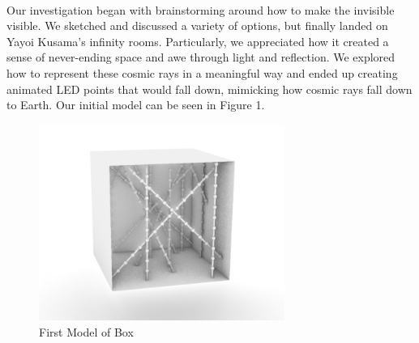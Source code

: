 \documentclass{article}
\begin{document}
\paragraph{}Our investigation began with brainstorming around how to make the invisible visible. We sketched and discussed a variety of options, but finally landed on Yayoi Kusama’s infinity rooms. Particularly, we appreciated how it created a sense of never-ending space and awe through light and reflection. We explored how to represent these cosmic rays in a meaningful way and ended up creating animated LED points that would fall down, mimicking how cosmic rays fall down to Earth. Our initial model can be seen in Figure 1.
\begin{figure}
    \centering
    \includegraphics[width=0.7143\textwidth]{model.jpg}
    \caption{First Model of Box}
\end{figure}
\end{document}
